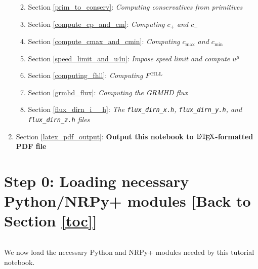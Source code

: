 \documentclass[landscape,letterpaper,10pt,english]{article}
\providecommand{\tightlist}{%
      \setlength{\itemsep}{0pt}\setlength{\parskip}{0pt}}
\let\Oldlatex\LaTeX
\renewcommand{\LaTeX}{\textrm{\Oldlatex}}
\begin{document}
\begin{enumerate}
  \begin{enumerate}
  \def\labelenumii{\arabic{enumii}.}
  \tightlist
  \item
    Section \ref{prim_to_conserv}: \emph{Computing conservatives from
    primitives}
  \item
    Section \ref{compute_cp_and_cm}: \emph{Computing \(c_{+}\) and
    \(c_{-}\)}
  \item
    Section \ref{compute_cmax_and_cmin}: \emph{Computing \(c_{\max}\)
    and \(c_{\min}\)}
  \item
    Section \ref{speed_limit_and_u4u}: \emph{Impose speed limit and
    compute \(u^{\mu}\)}
  \item
    Section \ref{computing_fhll}: \emph{Computing \(F^{\rm HLL}\)}
  \item
    Section \ref{grmhd_flux}: \emph{Computing the GRMHD flux}
  \item
    Section \ref{flux_dirn_i__h}: \emph{The \texttt{flux\_dirn\_x.h},
    \texttt{flux\_dirn\_y.h}, and \texttt{flux\_dirn\_z.h} files}
  \end{enumerate}
\item
  Section \ref{latex_pdf_output}: \textbf{Output this notebook to
  \(\LaTeX\)-formatted PDF file}
\end{enumerate}

    \section{\texorpdfstring{Step 0: Loading necessary Python/NRPy+ modules
{[}Back to
Section \ref{toc}{]}}{Step 0: Loading necessary Python/NRPy+ modules {[}Back to {]}}}\label{step-0-loading-necessary-pythonnrpy-modules-back-to-top}

\[\label{loading_modules}\]

We now load the necessary Python and NRPy+ modules needed by this
tutorial notebook.
\end{document}
